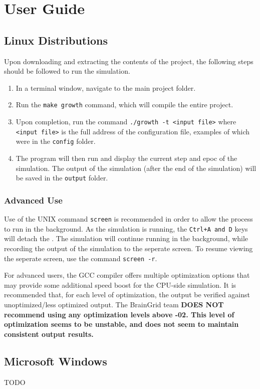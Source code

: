 \documentclass[11pt]{article}
\begin{document}
\section{User Guide}
\subsection{Linux Distributions}
\mdseries Upon downloading and extracting the contents of the project, the following steps should be followed to run the simulation.
\begin{enumerate}
	\item	In a terminal window, navigate to the main project folder. 
	\item Run the \verb|make growth| command, which will compile the entire project.
	\item Upon completion, run the command \verb|./growth -t <input file>| where \verb|<input file>| is the full address of the configuration file, examples of which were in the \verb|config| folder.
	\item The program will then run and display the current step and epoc of the simulation. The output of the simulation (after the end of the simulation) will be saved in the \verb|output| folder. 
\end{enumerate}
\subsubsection{Advanced Use}
\mdseries Use of the UNIX command \verb|screen| is recommended in order to allow the process to run in the background. As the simulation is running, the \verb |Ctrl+A and D| keys will detach the . The simulation will continue running in the background, while recording the output of the simulation to the seperate screen. To resume viewing the seperate screen, use the command \verb|screen -r|.

\noindent \mdseries For advanced users, the GCC compiler offers multiple optimization options that may provide some additional speed boost for the CPU-side simulation. It is recommended that, for each level of optimization, the output be verified against unoptimized/less optimized output. The BrainGrid team \bfseries DOES NOT \mdseries recommend using any optimization levels above -02. This level of optimization seems to be unstable, and does not seem to maintain consistent output results.   

\subsection{Microsoft Windows}
TODO
\pagebreak
\end{document}
